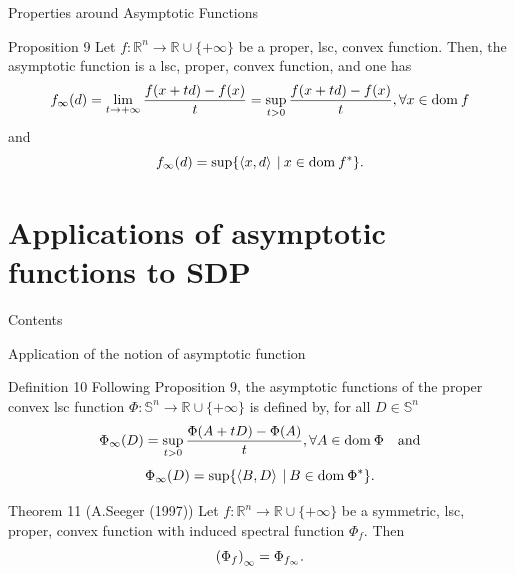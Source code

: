 \documentclass[aspectratio=169, dvipdfmx, 11pt]{beamer} %
\newcommand{\RealNumberSet}{\mathbb{R}}
\newcommand{\NDemenstionalRealEuclidianSpace}{\mathbb{R}^n}
\newcommand{\NDemenstionalRealSymmetricMatrixSpace}{\mathbb{S}^n}
\newcommand{\Domain}[1]{\text{\rm dom\:${#1}$}} %
\newcommand{\InnerProduct}[2]{\left\langle {#1},{#2}\right\rangle} %
\newcommand{\ExtendedRealValuedFunction}[2]{{#1}: {#2} \to \RealNumberSet \cup \{+\infty\}}
\newcommand{\ConjugateFunction}[1]{{#1}^*}
\begin{document}
\begin{frame}{Properties around Asymptotic Functions}
  \begin{block}{Proposition 9}
    Let $\ExtendedRealValuedFunction{f}{\NDemenstionalRealEuclidianSpace}$ be a proper, lsc, convex function. Then, the asymptotic function is a lsc, proper, convex function, and one has
    \begin{equation}
      f_{\infty} (d) = \lim_{t \to +\infty} \frac{f(x+td) -f(x)}{t} = \sup_{t > 0} \frac{f(x+td) -f(x)}{t}, \forall x \in \Domain{f} \notag
    \end{equation}
    and
    \begin{equation}
      f_{\infty} (d) = \sup \{\InnerProduct{x}{d} \:|\: x \in \Domain{\ConjugateFunction{f}}\}. \notag
    \end{equation}
  \end{block}
\end{frame}

\section{Applications of asymptotic functions to SDP}
\begin{frame}{Contents}
  \tableofcontents[currentsection]
\end{frame}

\begin{frame}{Application of the notion of asymptotic function}
  \begin{block}{Definition 10}
    Following Proposition 9, the asymptotic functions of the proper convex lsc function $\ExtendedRealValuedFunction{\Phi}{\NDemenstionalRealSymmetricMatrixSpace}$ is defined by, for all $D \in \NDemenstionalRealSymmetricMatrixSpace$
    \begin{equation}
      \Phi_{\infty} (D) = \sup_{t > 0} \frac{\Phi(A+tD) -\Phi(A)}{t}, \forall A \in \Domain{\Phi} \quad \text{and}\notag
    \end{equation}
    \begin{equation}
      \Phi_{\infty} (D) = \sup \{\InnerProduct{B}{D} \:|\: B \in \Domain{\ConjugateFunction{\Phi}}\}. \notag
    \end{equation}
  \end{block}

  \begin{block}{Theorem 11 (A.Seeger (1997))}
    Let $\ExtendedRealValuedFunction{f}{\NDemenstionalRealEuclidianSpace}$ be a symmetric, lsc, proper, convex function with induced spectral function $\Phi_{f}$. Then
    \begin{equation}
      {(\Phi_{f})}_{\infty} = \Phi_{f_{\infty}}. \notag
    \end{equation}
  \end{block}
\end{frame}
\end{document}
